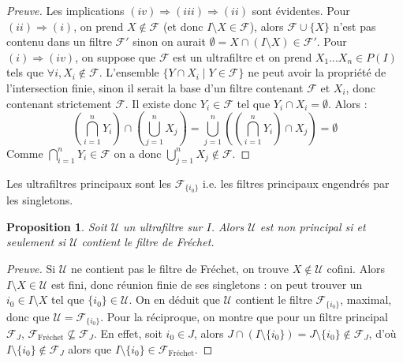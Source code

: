 \documentclass[11pt,a4paper]{report}
\newtheorem{prop}[theo]{Proposition}
\newcommand{\F}{\mathcal{F}}
\newcommand{\U}{\mathcal{U}}
\newcommand{\preuve}{\begin{proof}[Preuve]}
\newcommand{\cqfd}{\end{proof}}
\newcommand{\1}{\mathbbm{1}}
\begin{document}
\preuve
Les implications $(iv) \Rightarrow (iii) \Rightarrow (ii)$ sont évidentes. Pour $(ii) \Rightarrow (i)$, on prend $X \notin \F$ (et donc $I \setminus X \in \F$), alors $\F \cup \{X\}$ n'est pas contenu dans un filtre $\F'$ sinon on aurait $\emptyset = X \cap (I\setminus X) \in \F'$. Pour $(i) \Rightarrow (iv)$, on suppose que $\F$ est un ultrafiltre et on prend $X_1...X_n \in P(I)$ tels que $\forall i, X_i \notin \F$. L'ensemble $\{ Y \cap X_i \mid Y \in \F \}$ ne peut avoir la propriété de l'intersection finie, sinon il serait la base d'un filtre contenant $\F$ et $X_i$, donc contenant strictement $\F$. Il existe donc $Y_i \in \F$ tel que $Y_i \cap X_i = \emptyset$. Alors :
\[ \left( \bigcap_{i=1}^n Y_i \right) \cap \left( \bigcup_{j=1}^n X_j \right) = \bigcup_{j=1}^n \left( \left( \bigcap_{i=1}^n Y_i \right) \cap X_j \right) = \emptyset \]
Comme $\bigcap_{i=1}^n Y_i \in \F$ on a donc $\bigcup_{j=1}^n X_j \notin \F$.
\cqfd
Les ultrafiltres principaux sont les $\F_{\{i_0\}}$ i.e. les filtres principaux engendrés par les singletons.
\begin{prop}
Soit $\U$ un ultrafiltre sur $I$. Alors $\U$ est non principal si et seulement si $\U$ contient le filtre de Fréchet.
\end{prop}
\preuve
Si $\U$ ne contient pas le filtre de Fréchet, on trouve $X \notin \U$ cofini. Alors $I \setminus X \in \U$ est fini, donc réunion finie de ses singletons : on peut trouver un $i_0 \in I \setminus X$ tel que $\{i_0\} \in \U$. On en déduit que $\U$ contient le filtre $\F_{\{i_0\}}$, maximal, donc que $\U = \F_{\{i_0\}}$. Pour la réciproque, on montre que pour un filtre principal $\F_J$, $\F_\text{Fréchet} \nsubseteq \F_J$. En effet, soit $i_0 \in J$, alors $J \cap (I \setminus \{i_0\}) = J \setminus \{i_0\} \notin \F_J$, d'où $I \setminus \{i_0\} \notin \F_J$ alors que $I \setminus \{i_0\} \in \F_\text{Fréchet}$.
\cqfd
\end{document}
